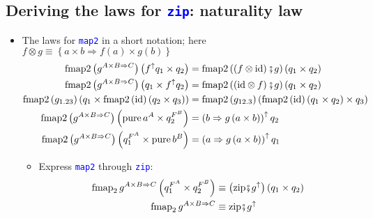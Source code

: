 \subsection{Deriving the laws for \texttt{\textcolor{blue}{\footnotesize{}zip}}:
naturality law}
\begin{itemize}
\item \vspace{-0.2cm}The laws for \texttt{\textcolor{blue}{\footnotesize{}map2}}
in a short notation; here{\footnotesize{} $f\otimes g\equiv\left\{ a\times b\Rightarrow f(a)\times g(b)\right\} $}
{\footnotesize{}
\begin{align*}
\text{fmap2}\left(g^{A\times B\Rightarrow C}\right)\left(f^{\uparrow}q_{1}\times q_{2}\right) & =\text{fmap2}\left(\left(f\otimes\text{id}\right)\bef g\right)\left(q_{1}\times q_{2}\right)\\
\text{fmap2}\left(g^{A\times B\Rightarrow C}\right)\left(q_{1}\times f^{\uparrow}q_{2}\right) & =\text{fmap2}\left(\left(\text{id}\otimes f\right)\bef g\right)\left(q_{1}\times q_{2}\right)\\
\text{fmap2}\left(g_{1.23}\right)\left(q_{1}\times\text{fmap2}\left(\text{id}\right)\left(q_{2}\times q_{3}\right)\right) & =\text{fmap2}\left(g_{12.3}\right)\left(\text{fmap2}\left(\text{id}\right)\left(q_{1}\times q_{2}\right)\times q_{3}\right)\\
\text{fmap2}\left(g^{A\times B\Rightarrow C}\right)\left(\text{pure}\,a^{A}\times q_{2}^{F^{B}}\right) & =\left(b\Rightarrow g\left(a\times b\right)\right)^{\uparrow}q_{2}\\
\text{fmap2}\left(g^{A\times B\Rightarrow C}\right)\left(q_{1}^{F^{A}}\times\text{pure}\,b^{B}\right) & =\left(a\Rightarrow g\left(a\times b\right)\right)^{\uparrow}q_{1}
\end{align*}
}{\footnotesize\par}
\begin{itemize}
\item Express \texttt{\textcolor{blue}{\footnotesize{}map2}} through \texttt{\textcolor{blue}{\footnotesize{}zip}}:{\footnotesize{}
\begin{align*}
\text{fmap}_{2}\,g^{A\times B\Rightarrow C}\left(q_{1}^{F^{A}}\times q_{2}^{F^{B}}\right) & \equiv\left(\text{zip}\bef g^{\uparrow}\right)\left(q_{1}\times q_{2}\right)\\
\text{fmap}_{2}\,g^{A\times B\Rightarrow C} & \equiv\text{zip}\bef g^{\uparrow}
\end{align*}
}{\footnotesize\par}

\end{itemize}
\end{itemize}
